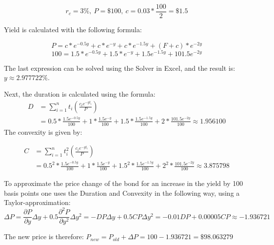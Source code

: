 \documentclass{article}
\begin{document}
$$r_c = 3\%, \ P = \$100, \ c = 0.03 * \frac{100}{2} = \$1.5$$

Yield is calculated with the following formula:

$$P = c * e^{-0.5y} + c*e^{-y} + c*e^{-1.5y} + (F+c)*e^{-2y}$$
$$100 = 1.5 * e^{-0.5y} + 1.5*e^{-y} + 1.5e^{-1.5y} + 101.5e^{-2y}$$

The last expression can be solved using the Solver in Excel, and the result is: $y \approx 2.977722 \%$.

Next, the duration is calculated using the formula:
\begin{align*}
	D &= \sum_{i=1}^n t_i \left(\frac{c_ie^{-yt_i}}{P}\right) \\
	&= 0.5 * \frac{1.5e^{-0.5y}}{100} + 1*\frac{1.5e^{-y}}{100} + 1.5 * \frac{1.5e^{-1.5y}}{100} + 2 * \frac{101.5e^{-2y}}{100} \approx 1.956100
\end{align*}
The convexity is given by:

\begin{align*}
	C &= \sum_{i=1}^n t_i^2 \left(\frac{c_ie^{-yt_i}}{P}\right) \\
	&= 0.5^2 * \frac{1.5e^{-0.5y}}{100} + 1*\frac{1.5e^{-y}}{100} + 1.5^2 * \frac{1.5e^{-1.5y}}{100} + 2^2 * \frac{101.5e^{-2y}}{100} \approx 3.875798
\end{align*}

To approximate the price change of the bond for an increase in the yield by 100 basis points one uses the Duration and Convexity in the following way, using a Taylor-approximation:
$$\Delta P = \frac{\partial P}{\partial y} \Delta y + 0.5 \frac{\partial^2 P}{\partial y^2} \Delta y^2 = -DP\Delta y + 0.5 CP \Delta y^2 = -0.01DP + 0.00005CP \approx -1.936721$$

The new price is therefore: $P_{new} = P_{old} + \Delta P = 100 -1.936721 = \$98.063279 $
\end{document}
